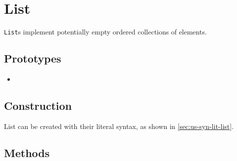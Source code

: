 \section{List}

\lstinline|List|s implement potentially empty ordered collections of
elements.

\subsection{Prototypes}

\begin{itemize}
\item {}
\end{itemize}

\subsection{Construction}

List can be created with their literal syntax, as shown in
\autoref{sec:us-syn-lit-list}.


\subsection{Methods}

